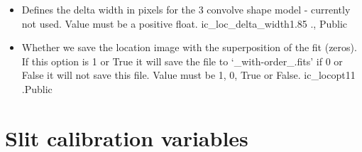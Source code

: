 \begin{itemize}
\item {}
{Defines the delta width in pixels for the 3 convolve shape model - currently not used. Value must be a positive float.}
{ic\_loc\_delta\_width}{1.85}
{\callocRAW}{\constantsfile}{\callocRAW.\progMAIN, \spirouKeywords}{Public}


\item {}
{Whether we save the location image with the superposition of the fit (zeros). If this option is 1 or True it will save the file to `\_with-order\_.fits' if 0 or False it will not save this file. Value must be 1, 0, True or False.}
{ic\_locopt1}{1}
{\callocRAW}{\constantsfile}{\callocRAW.\progMAIN}{Public}


\end{itemize}

\clearpage
\newpage
\section{Slit calibration variables}
\label{ch:variables:slit}


